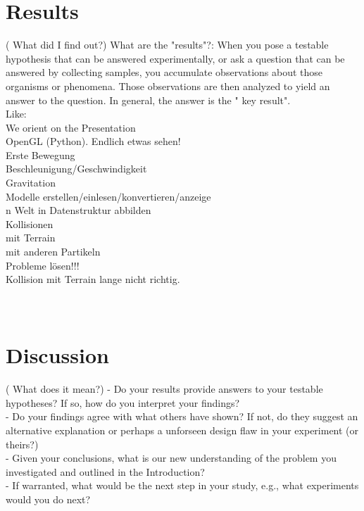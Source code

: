 \documentclass{sig-alternate-05-2015}
\begin{document}
\section{Results}
( What did I find out?)
What are the "results"?: When you pose a testable hypothesis that can be answered experimentally, or ask a question that can be answered by collecting samples, you accumulate observations about those organisms or phenomena. Those observations are then analyzed to yield an answer to the question. In general, the answer is the " key result".
\\
Like: \\
We orient on the Presentation\\
OpenGL (Python). Endlich etwas sehen!\\
Erste Bewegung\\
Beschleunigung/Geschwindigkeit\\
Gravitation\\
Modelle erstellen/einlesen/konvertieren/anzeige\\n
Welt in Datenstruktur abbilden\\
Kollisionen\\
mit Terrain\\
mit anderen Partikeln\\
Probleme lösen!!!\\
Kollision mit Terrain lange nicht richtig.\\
\\
\\

\section{Discussion}
( What does it mean?)
- Do your results provide answers to your testable hypotheses? If so, how do you interpret your findings?\\
- Do your findings agree with what others have shown? If not, do they suggest an alternative explanation or perhaps a unforseen design flaw in your experiment (or theirs?)\\
- Given your conclusions, what is our new understanding of the problem you investigated and outlined in the Introduction?\\
- If warranted, what would be the next step in your study, e.g., what experiments would you do next?\\
\\
\\


 
\end{document}
